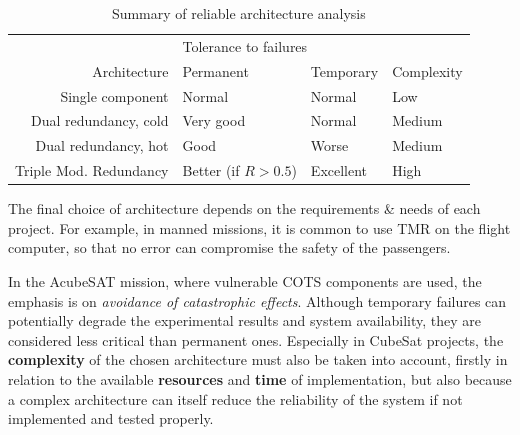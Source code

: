 \documentclass[a4paper,nobib]{tufte-book}
\begin{document}
\begin{table}[h]
	\caption{Summary of reliable architecture analysis}
	\label{tab:calcuresults}
	\begin{adjustbox}{center}
	\begin{tabular}{@{}rlll@{}}
		\toprule
		& \multicolumn{2}{l}{Tolerance to failures} & \\ \cmidrule{2-3}
		Architecture & Permanent & Temporary & Complexity \\ \midrule
		Single component & \color{MaterialGrey800} Normal & \color{MaterialGrey800} Normal & \color{MaterialGreen600} Low \\
		Dual redundancy, cold & \color{MaterialGreenA700} Very good & \color{MaterialGrey800} Normal & \color{MaterialOrange900} Medium\\
		Dual redundancy, hot & \color{MaterialGreen600} Good & \color{MaterialOrange900} Worse & \color{MaterialOrange900} Medium\\
		Triple Mod. Redundancy & \color{MaterialLime800} Better {\footnotesize(if \(R > 0.5\))} & \color{MaterialGreenA700} Excellent & \color{MaterialRed800} High \\ \bottomrule
	\end{tabular}
	\end{adjustbox}
\end{table}



The final choice of architecture depends on the requirements \& needs of each project. For example, in manned missions, it is common to use \acs{TMR} on the flight computer, so that no error can compromise the safety of the passengers.

In the AcubeSAT mission, where vulnerable \acs{COTS} components are used, the emphasis is on \emph{avoidance of catastrophic effects}. Although temporary failures can potentially degrade the experimental results and system availability, they are considered less critical than permanent ones. Especially in CubeSat projects, the \textbf{complexity} of the chosen architecture must also be taken into account, firstly in relation to the available \textbf{resources} and \textbf{time} of implementation, but also because a complex architecture can itself reduce the reliability of the system if not implemented and tested properly.
\end{document}
